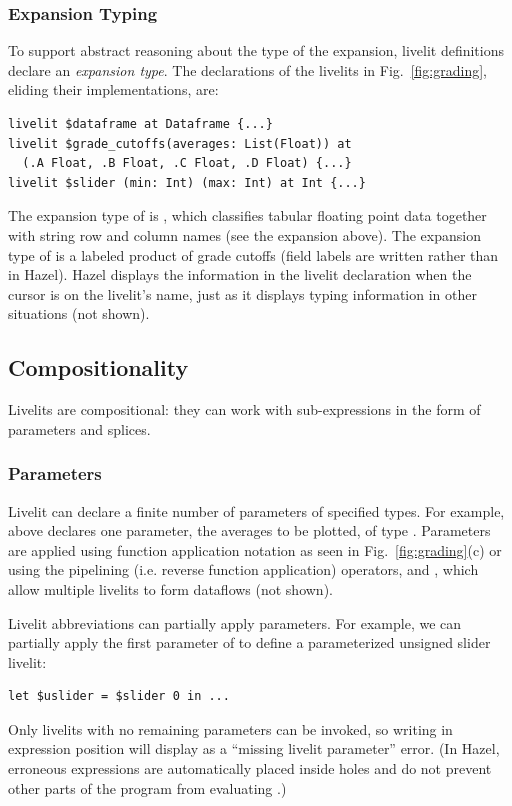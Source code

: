 \subsubsection{Expansion Typing}
\label{sec:expansion-typing}
To support abstract reasoning about the type of the expansion,
livelit definitions declare an \emph{expansion type}.
The declarations of the livelits in Fig.~\ref{fig:grading},
eliding their implementations, are:
\begin{lstlisting}[numbers=none,xleftmargin=0cm]
livelit $dataframe at Dataframe {...}
livelit $grade_cutoffs(averages: List(Float)) at
  (.A Float, .B Float, .C Float, .D Float) {...}
livelit $slider (min: Int) (max: Int) at Int {...}
\end{lstlisting}
The expansion type of  is ,
which classifies tabular floating point data together with string row and column names (see the expansion above).
The expansion type of  is a labeled product of grade cutoffs (field labels are written 
rather than  in Hazel).
Hazel displays the information in the livelit declaration when the cursor is on the livelit's name,
just as it displays typing information in other situations (not shown).

\subsection{Compositionality}\label{sec:splicing-and-parameterization}
Livelits are compositional: they can work with sub-expressions
in the form of parameters and splices.

\subsubsection{Parameters}\label{sec:parameterization}
Livelit can declare a finite number of parameters of specified types.
For example,  above declares one parameter,
the averages to be plotted, of type .
Parameters are applied
using function application notation
as seen in Fig.~\ref{fig:grading}(c) or
using the pipelining (i.e. reverse function application) operators, \li{<|} and \li{|>},
which allow multiple livelits to form dataflows (not shown).

Livelit abbreviations can partially apply parameters. For example,
we can partially apply the first parameter of  to define a parameterized unsigned slider livelit:
\begin{lstlisting}[numbers=none,xleftmargin=0cm]
let $uslider = $slider 0 in ...
\end{lstlisting}
Only livelits with no remaining parameters can be invoked,
so writing  in expression position will display as a ``missing livelit parameter'' error.
(In Hazel, erroneous expressions
are automatically placed inside holes and do not prevent other parts of the program from evaluating
\cite{HazelnutLive}.)


